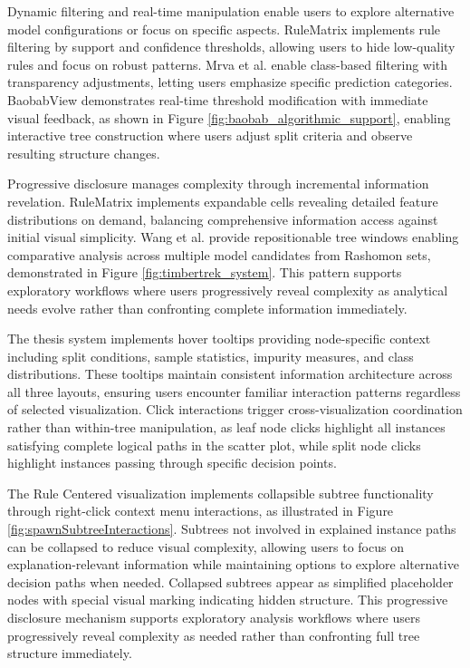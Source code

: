 Dynamic filtering and real-time manipulation enable users to explore alternative model configurations or focus on specific aspects. RuleMatrix \cite{ming2019rulematrix} implements rule filtering by support and confidence thresholds, allowing users to hide low-quality rules and focus on robust patterns. Mrva et al. \cite{mrva2019decision} enable class-based filtering with transparency adjustments, letting users emphasize specific prediction categories. BaobabView \cite{elzen2011baobabview} demonstrates real-time threshold modification with immediate visual feedback, as shown in Figure \ref{fig:baobab_algorithmic_support}, enabling interactive tree construction where users adjust split criteria and observe resulting structure changes.

Progressive disclosure manages complexity through incremental information revelation. RuleMatrix \cite{ming2019rulematrix} implements expandable cells revealing detailed feature distributions on demand, balancing comprehensive information access against initial visual simplicity. Wang et al. \cite{wang2022timbertrek} provide repositionable tree windows enabling comparative analysis across multiple model candidates from Rashomon sets, demonstrated in Figure \ref{fig:timbertrek_system}. This pattern supports exploratory workflows where users progressively reveal complexity as analytical needs evolve rather than confronting complete information immediately.

The thesis system implements hover tooltips providing node-specific context including split conditions, sample statistics, impurity measures, and class distributions. These tooltips maintain consistent information architecture across all three layouts, ensuring users encounter familiar interaction patterns regardless of selected visualization. Click interactions trigger cross-visualization coordination rather than within-tree manipulation, as leaf node clicks highlight all instances satisfying complete logical paths in the scatter plot, while split node clicks highlight instances passing through specific decision points.

The Rule Centered visualization implements collapsible subtree functionality through right-click context menu interactions, as illustrated in Figure \ref{fig:spawnSubtreeInteractions}. Subtrees not involved in explained instance paths can be collapsed to reduce visual complexity, allowing users to focus on explanation-relevant information while maintaining options to explore alternative decision paths when needed. Collapsed subtrees appear as simplified placeholder nodes with special visual marking indicating hidden structure. This progressive disclosure mechanism supports exploratory analysis workflows where users progressively reveal complexity as needed rather than confronting full tree structure immediately.

